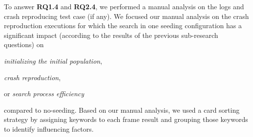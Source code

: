 To answer \textbf{RQ1.4} and \textbf{RQ2.4}, we performed a manual analysis on the logs and crash reproducing test case (if any). We focused our manual analysis on the crash reproduction executions for which the search in one seeding configuration has a significant  impact (according to the results of the previous sub-research questions) on 
\begin{inparaenum}[(i)]
\item \textit{initializing the initial population},
\item \textit{crash reproduction},
\item or \textit{search process efficiency}
\end{inparaenum}
 compared to no-seeding.
Based on our manual analysis, we used a card sorting strategy by assigning keywords to each frame result and grouping those keywords to identify influencing factors.